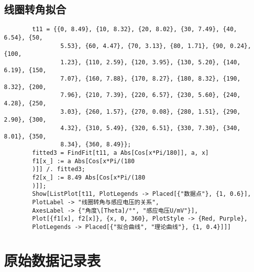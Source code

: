 \documentclass[11pt]{article}
\begin{document}
	\subsection{线圈转角拟合}
	\begin{lstlisting}
		t11 = {{0, 8.49}, {10, 8.32}, {20, 8.02}, {30, 7.49}, {40, 6.54}, {50,
				5.53}, {60, 4.47}, {70, 3.13}, {80, 1.71}, {90, 0.24}, {100, 
				1.23}, {110, 2.59}, {120, 3.95}, {130, 5.20}, {140, 6.19}, {150, 
				7.07}, {160, 7.88}, {170, 8.27}, {180, 8.32}, {190, 8.32}, {200, 
				7.96}, {210, 7.39}, {220, 6.57}, {230, 5.60}, {240, 4.28}, {250, 
				3.03}, {260, 1.57}, {270, 0.08}, {280, 1.51}, {290, 2.90}, {300, 
				4.32}, {310, 5.49}, {320, 6.51}, {330, 7.30}, {340, 8.01}, {350, 
				8.34}, {360, 8.49}};
		fitted3 = FindFit[t11, a Abs[Cos[x*Pi/180]], a, x]
		f1[x_] := a Abs[Cos[x*Pi/(180
		)]] /. fitted3;
		f2[x_] := 8.49 Abs[Cos[x*Pi/(180
		)]];
		Show[ListPlot[t11, PlotLegends -> Placed[{"数据点"}, {1, 0.6}], 
		PlotLabel -> "线圈转角与感应电压的关系", 
		AxesLabel -> {"角度\[Theta]/°", "感应电压U/mV"}], 
		Plot[{f1[x], f2[x]}, {x, 0, 360}, PlotStyle -> {Red, Purple}, 
		PlotLegends -> Placed[{"拟合曲线", "理论曲线"}, {1, 0.4}]]]
	\end{lstlisting}
	
	\section{原始数据记录表}
	
	
\end{document}
